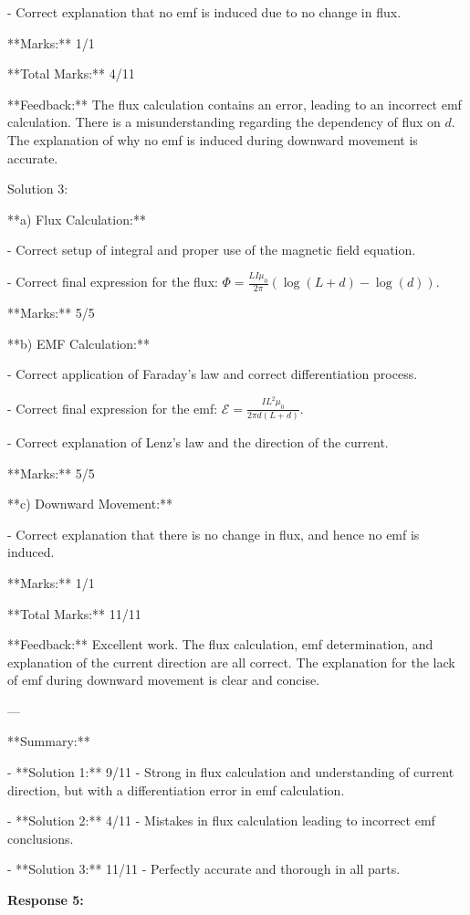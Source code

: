 \documentclass[a4paper,11pt]{article}
\begin{document}
- Correct explanation that no emf is induced due to no change in flux.

**Marks:** 1/1

**Total Marks:** 4/11

**Feedback:** The flux calculation contains an error, leading to an incorrect emf calculation. There is a misunderstanding regarding the dependency of flux on \(d\). The explanation of why no emf is induced during downward movement is accurate.

Solution 3:

**a) Flux Calculation:**

- Correct setup of integral and proper use of the magnetic field equation.

- Correct final expression for the flux: \(\Phi = \frac{L I \mu_0}{2\pi} \left( \log(L + d) - \log(d) \right)\).

**Marks:** 5/5

**b) EMF Calculation:**

- Correct application of Faraday's law and correct differentiation process.

- Correct final expression for the emf: \(\mathcal{E} = \frac{I L^2 \mu_0}{2\pi d (L + d)}\).

- Correct explanation of Lenz's law and the direction of the current.

**Marks:** 5/5

**c) Downward Movement:**

- Correct explanation that there is no change in flux, and hence no emf is induced.

**Marks:** 1/1

**Total Marks:** 11/11

**Feedback:** Excellent work. The flux calculation, emf determination, and explanation of the current direction are all correct. The explanation for the lack of emf during downward movement is clear and concise.

---

**Summary:**

- **Solution 1:** 9/11 - Strong in flux calculation and understanding of current direction, but with a differentiation error in emf calculation.

- **Solution 2:** 4/11 - Mistakes in flux calculation leading to incorrect emf conclusions.

- **Solution 3:** 11/11 - Perfectly accurate and thorough in all parts.

\bigskip 
\textbf{Response 5:}
\end{document}
